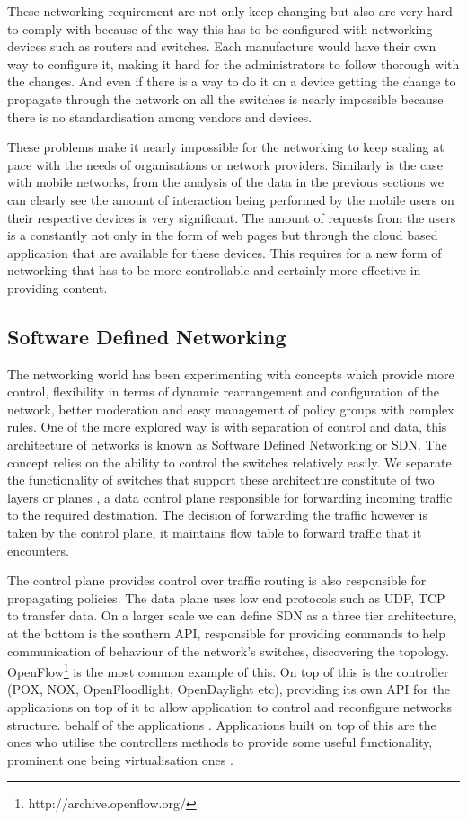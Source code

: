 \documentclass[prodmode,acmtecs]{acmsmall}
\begin{document}
These networking requirement are not only keep changing but also are very hard to comply with because of the way this has to be configured with networking devices such as routers and switches. Each manufacture would have their own way to configure it, making it hard for the administrators to follow thorough with the changes. And even if there is a way to do it on a device getting the change to propagate through the network on all the switches is nearly impossible because there is no standardisation among vendors and devices.

These problems make it nearly impossible for the networking to keep scaling at pace with the needs of organisations or network providers. Similarly is the case with mobile networks, from the analysis of the data in the previous sections we can clearly see the amount of interaction being performed by the mobile users on their respective devices is very significant. The amount of requests from the users is a constantly not only in the form of web pages but through the cloud based application that are available for these devices. This requires for a new form of networking that has to be more controllable and certainly more effective in providing content.

\subsection{Software Defined Networking}
The networking world has been experimenting with concepts which provide more control, flexibility in terms of dynamic rearrangement and configuration of the network, better moderation and easy management of policy groups with complex rules. One of the more explored way is with separation of control and data, this architecture of networks is known as Software Defined Networking or SDN. The concept relies on the ability to control the switches relatively easily. We separate the functionality of switches that support these architecture constitute of two layers or planes \cite{kirkpatrick2013software}, a data control plane responsible for forwarding incoming traffic to the required destination. The decision of forwarding the traffic however is taken by the control plane, it maintains flow table to forward traffic that it encounters.

The control plane provides control over traffic routing is also responsible for propagating policies. The data plane uses low end protocols such as UDP, TCP to transfer data. On a larger scale we can define SDN as a three tier architecture, at the bottom is the southern API, responsible for providing commands to help communication of behaviour of the network's switches, discovering the topology. OpenFlow\footnote{http://archive.openflow.org/} is the most common example of this. On top of this is the controller (POX, NOX, OpenFloodlight, OpenDaylight etc), providing its own API for the applications on top of it to allow application to control and reconfigure networks structure.
behalf of the applications \cite{paradis2014software}. Applications built on top of this are the ones who utilise the controllers methods to provide some useful functionality, prominent one being virtualisation ones \cite{alaettinoglu2013software}. 
\end{document}
